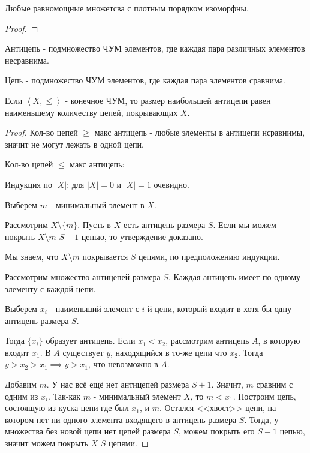 \begin{theorem} \thmslashn

    Любые равномощные множетсва с плотным порядком изоморфны.
    \begin{proof} \thmslashn
    
        \TODO
    \end{proof}
\end{theorem}
\begin{definition} \thmslashn 

    Антицепь - подмножество ЧУМ элементов, где каждая пара различных элементов несравнима.
\end{definition}
\begin{definition} \thmslashn 

    Цепь - подмножество ЧУМ элементов, где каждая пара элементов сравнима.
\end{definition}
\begin{theorem} \thmslashn

    Если $\left<X, \le \right>$ - конечное ЧУМ, то размер наибольшей антицепи равен наименьшему количеству цепей, покрывающих $X$.
    \begin{proof} \thmslashn
    
       Кол-во цепей $\ge $ макс антицепь - любые элементы в антицепи нсравнимы, значит не могут лежать в одной цепи.

       Кол-во цепей $\le $ макс антицепь:

       Индукция по $|X|$: для $|X| = 0$ и $|X| =1$ очевидно.

       Выберем $m$ - минимальный элемент в $X$.

       Рассмотрим $X \setminus \{m\} $. Пусть в $X$ есть антицепь размера $S$. Если мы можем покрыть $X \setminus m$ $S - 1$ цепью, то утверждение доказано. 

       Мы знаем, что $X \setminus m$ покрывается $S$ цепями, по предположению индукции.

       Рассмотрим множество антицепей размера $S$. Каждая антицепь имеет по одному элементу с каждой цепи.

       Выберем $x_{i}$ - наименьший элемент с $i$-й цепи, который входит в хотя-бы одну антицепь размера $S$.

       Тогда $\{x_{i}\} $ образует антицепь. Если $x_1 < x_2$, рассмотрим антицепь $A$, в которую входит $x_1$. В $A$ существует $y$, находящийся в то-же цепи что $x_2$. Тогда $y > x_2 > x_1 \implies y > x_1$, что невозможно в $A$.

        Добавим $m$.  У нас всё ещё нет антицепей размера $S + 1$. Значит,  $m$ сравним с одним из  $x_{i}$. Так-как $m$ - минимальный элемент  $X$, то  $m < x_1$. Построим цепь, состоящую из куска цепи где был $x_1$, и $m$. Остался <<хвост>> цепи, на котором нет ни одного элемента входящего в антицепь размера  $S$. Тогда, у множества без новой цепи нет цепей размера  $S$, можем покрыть его  $S-1$ цепью, значит можем покрыть  $X$  $S$ цепями. 
   \end{proof}
\end{theorem}
